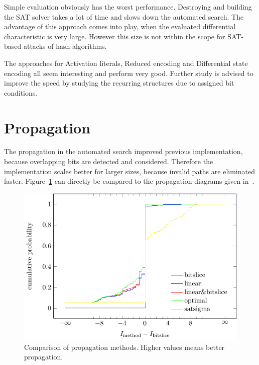 Simple evaluation obviously has the worst performance. Destroying and building the SAT solver takes a lot of time and slows down the automated search. The advantage of this approach comes into play, when the evaluated differential characteristic is very large. However this size is not within the scope for SAT-based attacks of hash algorithms.

The approaches for Activation literals, Reduced encoding and Differential state encoding all seem interesting and perform very good. Further study is advised to improve the speed by studying the recurring structures due to assigned bit conditions.

\section{Propagation}
%
The propagation in the automated search improved previous implementation, because overlapping bits are detected and considered. Therefore the implementation scales better for larger sizes, because invalid paths are eliminated faster. Figure~\ref{fig:sat-propagation} can directly be compared to the propagation diagrams given in~\cite{Cry16}.
%
\begin{figure}[t]
 \begin{center}
  \includegraphics{img/propagation.pdf}
  \caption[Comparison of propagation methods.]{Comparison of propagation methods. Higher values means better propagation.}
  \label{fig:sat-propagation}
 \end{center}
\end{figure}

